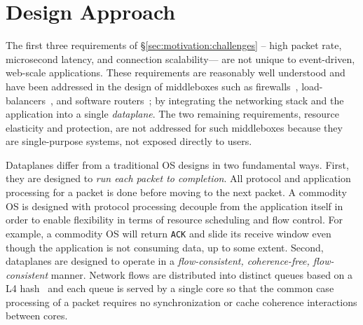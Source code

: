 \section{\ix Design Approach}
\label{sec:design}


The first three requirements of \S\ref{sec:motivation:challenges} --
high packet rate, microsecond latency, and connection scalability---
are not unique to event-driven, web-scale applications.  These
requirements are reasonably well understood and have been addressed in
the design of middleboxes such as firewalls~\cite{missing},
load-balancers~\cite{missing}, and software
routers~\cite{DBLP:journals/tocs/KohlerMCJK00,DBLP:conf/sosp/DobrescuEACFIKMR09};
by integrating the networking stack and the application into a single
\emph{dataplane}. The two remaining requirements, resource elasticity
and protection, are not addressed for such middleboxes because they
are single-purpose systems, not exposed directly to users. 


Dataplanes differ from a traditional OS designs in two fundamental
ways. First, they are designed to \emph{run each packet to
  completion}. All protocol and application processing for a packet is
done before moving to the next packet.  A commodity OS is designed
with protocol processing decouple from the application itself in order
to enable flexibility in terms of resource scheduling and flow
control. For example, a commodity OS will return \texttt{ACK} and
slide its receive window even though the application is not consuming
data, up to some extent. Second, dataplanes are designed to operate in
a \emph{flow-consistent, coherence-free, flow-consistent} manner.
Network flows are distributed into distinct queues based on a L4
hash~\cite{rssref} and each queue is served by a single core so that
the common case processing of a packet requires no
synchronization or cache coherence interactions between cores.

